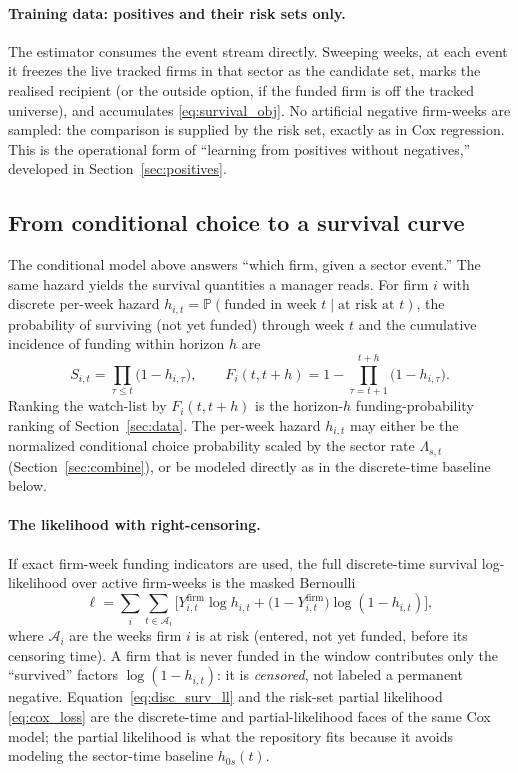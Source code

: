 \documentclass[11pt]{article}
\theoremstyle{plain}
\theoremstyle{definition}
\theoremstyle{remark}
\newcommand{\Prob}{\mathbb{P}}
\begin{document}
\paragraph{Training data: positives and their risk sets only.}
The estimator consumes the event stream directly. Sweeping weeks, at each event it freezes the live tracked firms in that sector as the candidate set, marks the realised recipient (or the outside option, if the funded firm is off the tracked universe), and accumulates \eqref{eq:survival_obj}. No artificial negative firm-weeks are sampled: the comparison is supplied by the risk set, exactly as in Cox regression. This is the operational form of ``learning from positives without negatives,'' developed in Section~\ref{sec:positives}.

\subsection{From conditional choice to a survival curve}
The conditional model above answers ``which firm, given a sector event.'' The same hazard yields the survival quantities a manager reads. For firm $i$ with discrete per-week hazard $h_{i,t}=\Prob(\text{funded in week }t\mid\text{at risk at }t)$, the probability of surviving (not yet funded) through week $t$ and the cumulative incidence of funding within horizon $h$ are
\begin{equation}
S_{i,t}=\prod_{\tau\le t}\big(1-h_{i,\tau}\big),\qquad
F_i(t,t{+}h)=1-\prod_{\tau=t+1}^{t+h}\big(1-h_{i,\tau}\big).
\label{eq:survival_curve}
\end{equation}
Ranking the watch-list by $F_i(t,t{+}h)$ is the horizon-$h$ funding-probability ranking of Section~\ref{sec:data}. The per-week hazard $h_{i,t}$ may either be the normalized conditional choice probability scaled by the sector rate $\Lambda_{s,t}$ (Section~\ref{sec:combine}), or be modeled directly as in the discrete-time baseline below.

\paragraph{The likelihood with right-censoring.}
If exact firm-week funding indicators are used, the full discrete-time survival log-likelihood over active firm-weeks is the masked Bernoulli
\begin{equation}
\ell=\sum_{i}\sum_{t\in\mathcal A_i}\Big[Y^{\mathrm{firm}}_{i,t}\log h_{i,t}+\big(1-Y^{\mathrm{firm}}_{i,t}\big)\log(1-h_{i,t})\Big],
\label{eq:disc_surv_ll}
\end{equation}
where $\mathcal A_i$ are the weeks firm $i$ is at risk (entered, not yet funded, before its censoring time). A firm that is never funded in the window contributes only the ``survived'' factors $\log(1-h_{i,t})$: it is \emph{censored}, not labeled a permanent negative. Equation~\eqref{eq:disc_surv_ll} and the risk-set partial likelihood \eqref{eq:cox_loss} are the discrete-time and partial-likelihood faces of the same Cox model; the partial likelihood is what the repository fits because it avoids modeling the sector-time baseline $h_{0s}(t)$.
\end{document}
